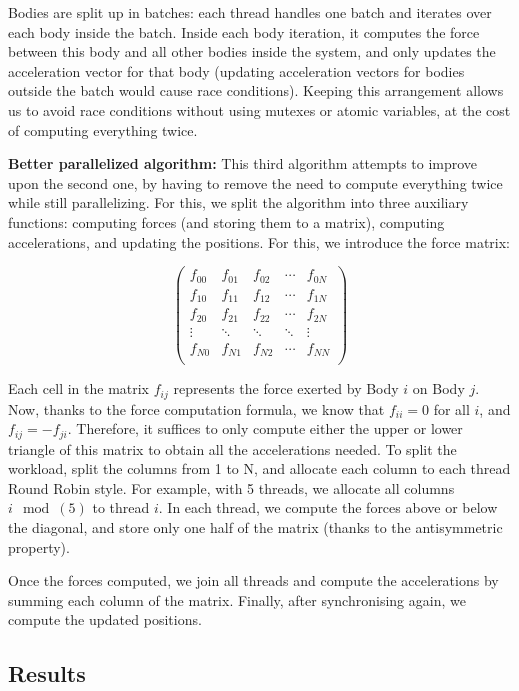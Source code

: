 \documentclass{article}
\begin{document}
Bodies are split up in batches: each thread handles one batch and iterates over each body inside the batch. Inside each body iteration, it computes the force between this body and all other bodies inside the system, and only updates the acceleration vector for that body (updating acceleration vectors for bodies outside the batch would cause race conditions). Keeping this arrangement allows us to avoid race conditions without using mutexes or atomic variables, at the cost of computing everything twice.


\textbf{Better parallelized algorithm:}
This third algorithm attempts to improve upon the second one, by having to remove the need to compute everything twice while still parallelizing. For this, we split the algorithm into three auxiliary functions: computing forces (and storing them to a matrix), computing accelerations, and updating the positions. For this, we introduce the force matrix:

\[\begin{pmatrix}
f_{00} & f_{01} & f_{02} & \cdots & f_{0N} \\
f_{10} & f_{11} & f_{12} & \cdots & f_{1N} \\
f_{20} & f_{21} & f_{22} & \cdots & f_{2N} \\
\vdots & \ddots & \ddots & \ddots & \vdots \\
f_{N0} & f_{N1} & f_{N2} & \cdots & f_{NN} \\
\end{pmatrix}
\]

Each cell in the matrix $f_{ij}$ represents the force exerted by Body $i$ on Body $j$. Now, thanks to the force computation formula, we know that $f_{ii}=0$ for all $i$, and $f_{ij}= -f_{ji}$. Therefore, it suffices to only compute either the upper or lower triangle of this matrix to obtain all the accelerations needed. To split the workload, split the columns from 1 to N, and allocate each column to each thread Round Robin style. For example, with 5 threads, we allocate all columns $i\mod(5)$ to thread $i$. In each thread, we compute the forces above or below the diagonal, and store only one half of the matrix (thanks to the antisymmetric property).

Once the forces computed, we join all threads and compute the accelerations by summing each column of the matrix. Finally, after synchronising again, we compute the updated positions.

\subsection{Results}
\end{document}

